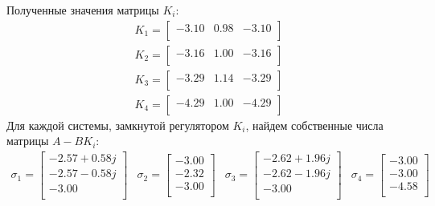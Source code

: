 Полученные значения матрицы $K_i$:
\begin{equation}
    \begin{array}{cccc}
        K_1 = \begin{bmatrix}
            -3.10  & 0.98  & -3.10 \\ 
        \end{bmatrix} \\
        K_2 = \begin{bmatrix}
            -3.16  & 1.00  & -3.16 \\ 
        \end{bmatrix} \\
        K_3 = \begin{bmatrix}
            -3.29  & 1.14  & -3.29 \\ 
        \end{bmatrix} \\ 
        K_4 = \begin{bmatrix}
            -4.29  & 1.00  & -4.29 \\
        \end{bmatrix}
    \end{array}
\end{equation}
Для каждой системы, замкнутой регулятором $K_i$, найдем собственные числа матрицы $A - BK_i$: 
\begin{equation}
    \begin{array}{cccc}
        \sigma_1 = \begin{bmatrix}
            -2.57 + 0.58j \\ 
            -2.57 - 0.58j \\ 
            -3.00 \\ 
        \end{bmatrix} & 
        \sigma_2 = \begin{bmatrix}
            -3.00 \\ 
            -2.32 \\ 
            -3.00 \\ 
        \end{bmatrix} &
        \sigma_3 = \begin{bmatrix}
            -2.62 + 1.96j \\ 
            -2.62 - 1.96j \\ 
            -3.00 \\ 
        \end{bmatrix} &
        \sigma_4 = \begin{bmatrix}
            -3.00 \\ 
            -3.00 \\ 
            -4.58 \\ 
        \end{bmatrix}
    \end{array}
\end{equation}

